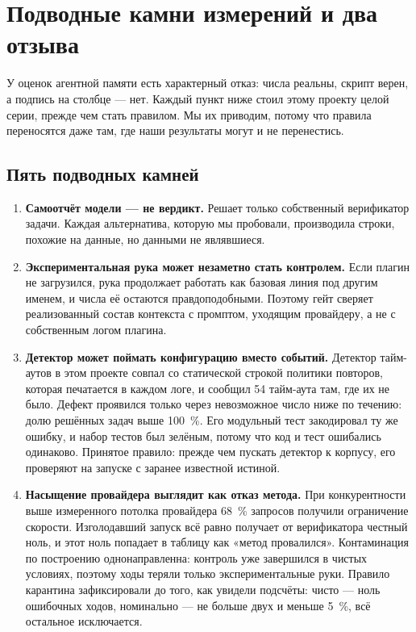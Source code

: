 \section{Подводные камни измерений и два отзыва}
\label{sec:pitfalls}

У оценок агентной памяти есть характерный отказ: числа реальны, скрипт
верен, а подпись на столбце — нет. Каждый пункт ниже стоил этому проекту
целой серии, прежде чем стать правилом. Мы их приводим, потому что правила
переносятся даже там, где наши результаты могут и не перенестись.

\subsection{Пять подводных камней}

\begin{enumerate}
\item \textbf{Самоотчёт модели — не вердикт.} Решает только собственный
      верификатор задачи. Каждая альтернатива, которую мы пробовали,
      производила строки, похожие на данные, но данными не являвшиеся.

\item \textbf{Экспериментальная рука может незаметно стать контролем.}
      Если плагин не загрузился, рука продолжает работать как базовая линия
      под другим именем, и числа её остаются правдоподобными. Поэтому гейт
      сверяет реализованный состав контекста с промптом, уходящим
      провайдеру, а не с собственным логом плагина\code.

\item \textbf{Детектор может поймать конфигурацию вместо событий.}
      Детектор тайм-аутов в этом проекте совпал со статической строкой
      политики повторов, которая печатается в каждом логе, и сообщил 54
      тайм-аута там, где их не было\live. Дефект проявился только через
      невозможное число ниже по течению: долю решённых задач выше
      \SI{100}{\percent}. Его модульный тест закодировал ту же ошибку, и
      набор тестов был зелёным, потому что код и тест ошибались одинаково.
      Принятое правило: прежде чем пускать детектор к корпусу, его
      проверяют на запуске с заранее известной истиной.

\item \textbf{Насыщение провайдера выглядит как отказ метода.} При
      конкурентности выше измеренного потолка провайдера \SI{68}{\percent}
      запросов получили ограничение скорости\live. Изголодавший запуск всё
      равно получает от верификатора честный ноль, и этот ноль попадает в
      таблицу как «метод провалился». Контаминация по построению
      однонаправленна: контроль уже завершился в чистых условиях, поэтому
      ходы теряли только экспериментальные руки. Правило карантина
      зафиксировали до того, как увидели подсчёты: чисто — ноль ошибочных
      ходов, номинально — не больше двух и меньше \SI{5}{\percent}, всё
      остальное исключается.


\end{enumerate}
